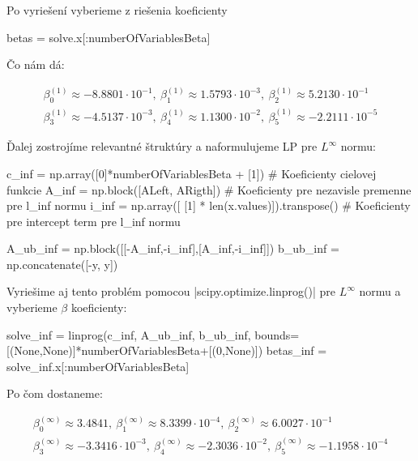 \documentclass[12pt,oneside,a4paper,slovak]{article}
\begin{document}
Po vyriešení vyberieme z riešenia koeficienty

\begin{python}
betas = solve.x[:numberOfVariablesBeta]
\end{python}

Čo nám dá: 

\begin{gather*}
	\beta_0^{(1)} \approx -8.8801 \cdot 10^{-1} ,~\beta_1^{(1)} \approx 1.5793\cdot 10^{-3},~\beta_2^{(1)} \approx 5.2130\cdot 10^{-1} \\
	\beta_3^{(1)} \approx -4.5137\cdot 10^{-3} ,~\beta_4^{(1)} \approx 1.1300\cdot 10^{-2}  ,~\beta_5^{(1)} \approx -2.2111\cdot 10^{-5}
\end{gather*}

\newpage

Ďalej zostrojíme relevantné štruktúry a naformulujeme LP pre $L^{\infty}$ normu:

\begin{python}
c_inf = np.array([0]*numberOfVariablesBeta + [1]) # Koeficienty cielovej funkcie
A_inf = np.block([ALeft, ARigth]) # Koeficienty pre nezavisle premenne pre l_inf normu
i_inf = np.array([ [1] * len(x.values)]).transpose() # Koeficienty pre intercept term pre l_inf normu

A_ub_inf = np.block([[-A_inf,-i_inf],[A_inf,-i_inf]])
b_ub_inf = np.concatenate([-y, y]) 
\end{python}

Vyriešime aj tento problém pomocou \pyth|scipy.optimize.linprog()| pre $L^{\infty}$ normu a vyberieme $\beta$ koeficienty:

\begin{python}
solve_inf = linprog(c_inf, A_ub_inf, b_ub_inf, bounds=[(None,None)]*numberOfVariablesBeta+[(0,None)])
betas_inf = solve_inf.x[:numberOfVariablesBeta]
\end{python}

Po čom dostaneme:

\begin{gather*}
	\beta_0^{(\infty)} \approx  3.4841 ,~\beta_1^{(\infty)} \approx 8.3399\cdot 10^{-4} ,~\beta_2^{(\infty)} \approx 6.0027\cdot 10^{-1} \\
	\beta_3^{(\infty)} \approx -3.3416\cdot 10^{-3} ,~\beta_4^{(\infty)} \approx -2.3036\cdot 10^{-2}  ,~\beta_5^{(\infty)} \approx -1.1958\cdot 10^{-4}
\end{gather*}
\end{document}
